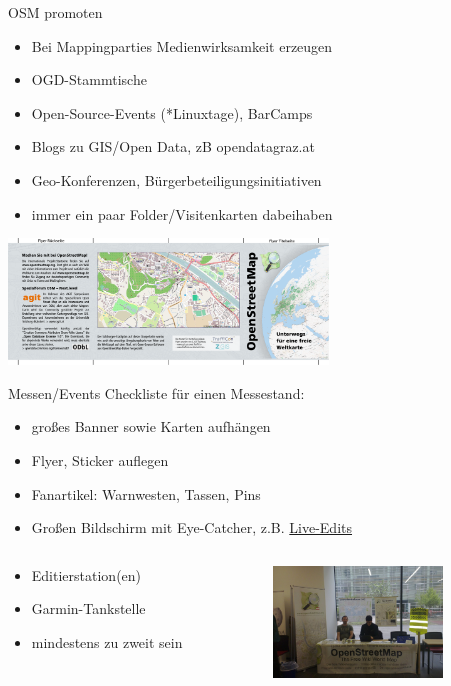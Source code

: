 \documentclass{beamer}
\begin{document}
\begin{frame}{OSM promoten}
	
	\begin{itemize}
		\item Bei Mappingparties Medienwirksamkeit erzeugen
		\item OGD-Stammtische
		\item Open-Source-Events (*Linuxtage), BarCamps
		\item Blogs zu GIS/Open Data, zB opendatagraz.at
		\item Geo-Konferenzen, Bürgerbeteiligungsinitiativen
			\pause
		\item immer ein paar Folder/Visitenkarten dabeihaben
	\end{itemize}
	\begin{center}
		\includegraphics[width=8.5cm]{Osmflyer-front-aut.pdf}
	\end{center}
\end{frame}

\begin{frame}{Messen/Events}
	Checkliste für einen Messestand:
	\begin{itemize}
		\item großes Banner sowie Karten aufhängen
		\item Flyer, Sticker auflegen
		\item Fanartikel: Warnwesten, Tassen, Pins
		\item Großen Bildschirm mit Eye-Catcher, z.B. \href{http://osmlab.github.io/show-me-the-way/}{Live-Edits}
	\end{itemize}
	\begin{columns}[t] %
		\begin{column}[T]{.4\textwidth}

	\begin{itemize}
		\item Editierstation(en)
		\item Garmin-Tankstelle
		\item mindestens zu zweit sein
	\end{itemize}
	\end{column}

	\begin{column}[T]{.5\textwidth}
				    \includegraphics[width=4.5cm]{liwo2013_stand_big.jpg}
				    \end{column}
				    \end{columns}
\end{frame}
\end{document}
